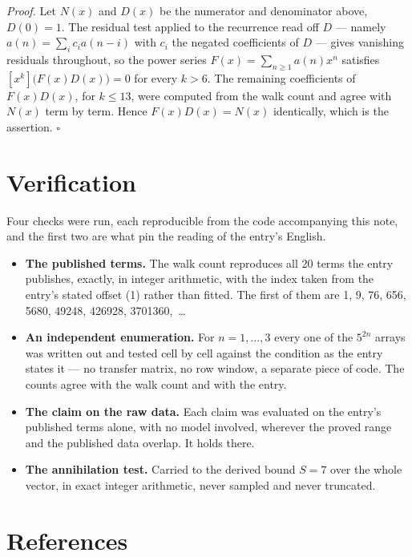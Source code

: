 \documentclass[11pt]{article}
\theoremstyle{definition}
\begin{document}
{\itshape Proof.} Let $N(x)$ and $D(x)$ be the numerator and denominator above, $D(0)=1$. The residual test applied to the recurrence read off $D$ --- namely $a(n) = \sum_i c_i a(n-i)$ with $c_i$ the negated coefficients of $D$ --- gives vanishing residuals throughout, so the power series $F(x)=\sum_{n\ge 1}a(n)x^n$ satisfies $[x^k]\bigl(F(x)D(x)\bigr) = 0$ for every $k > 6$. The remaining coefficients of $F(x)D(x)$, for $k \le 13$, were computed from the walk count and agree with $N(x)$ term by term. Hence $F(x)D(x) = N(x)$ identically, which is the assertion. $\square$

\section{Verification}

Four checks were run, each reproducible from the code accompanying this note, and the first two are what pin the reading of the entry's English.

\begin{itemize}

\item {\bfseries The published terms.} The walk count reproduces all 20 terms the entry publishes, exactly, in integer arithmetic, with the index taken from the entry's stated offset (1) rather than fitted. The first of them are 1, 9, 76, 656, 5680, 49248, 426928, 3701360,~\dots

\item {\bfseries An independent enumeration.} For $n = 1,\dots,3$ every one of the $5^{2n}$ arrays was written out and tested cell by cell against the condition as the entry states it --- no transfer matrix, no row window, a separate piece of code. The counts agree with the walk count and with the entry.

\item {\bfseries The claim on the raw data.} Each claim was evaluated on the entry's published terms alone, with no model involved, wherever the proved range and the published data overlap. It holds there.

\item {\bfseries The annihilation test.} Carried to the derived bound $S = 7$ over the whole vector, in exact integer arithmetic, never sampled and never truncated.

\end{itemize}

\section{References}
\end{document}
